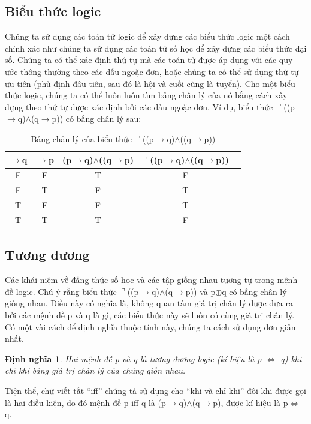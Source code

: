 \documentclass[11pt,a4paper,oneside]{article}
\newtheorem{modeling_def}{Định nghĩa }
\begin{document}
\subsection{Biểu thức logic}
Chúng ta sử dụng các toán tử logic để xây dựng các biểu thức logic một cách chính xác như chúng ta sử dụng các toán tử số học để xây dựng các biểu thức đại số. Chúng ta có thể xác định thứ tự mà các toán tử được áp dụng với các quy ước thông thường theo các dấu ngoặc đơn, hoặc chúng ta có thể sử dụng thứ tự ưu tiên (phủ định đâu tiên, sau đó là hội và cuối cùng là tuyển). Cho một biểu thức logic, chúng ta có thể luôn luôn tìm bảng chân lý của nó bằng cách xây dựng theo thứ tự được xác định bởi các dấu ngoặc đơn. Ví dụ, biểu thức $\urcorner$((p$\rightarrow$q)$\wedge$(q$\rightarrow$p)) có bẳng chân lý sau:

\begin{table}
\centering
\caption{Bảng chân lý của biểu thức
$\urcorner$((p$\rightarrow$q)$\wedge$((q$\rightarrow$p))}
\begin{tabular}{|c|c|c|c|l|} 
\hline $\rightarrow$q&$\rightarrow$p&(p$\rightarrow$q)$\wedge$((q$\rightarrow$p)&$\urcorner$((p$\rightarrow$q)$\wedge$((q$\rightarrow$p))\\ 
\hline F&F&T&F\\ 
\hline F&T&F&T\\ 
\hline T&F&F&T\\ 
\hline T&T&T&F\\
\hline\end{tabular}
\end{table}

\subsection{Tương đương}
Các khái niệm về đẳng thức số học và các tập giống nhau tương tự trong mệnh đề logic. Chú ý rằng biểu thức $\urcorner$((p$\rightarrow$q)$\wedge$(q$\rightarrow$p)) và p$\oplus$q có bẳng chân lý giống nhau. Điều này có nghĩa là, không quan tâm giá trị chân lý được đưa ra bởi các mệnh đề p và q là gì, các biểu thức này sẽ luôn có cùng giá trị chân lý. Có một vài cách để định nghĩa thuộc tính này, chúng ta cách sử dụng đơn giản nhất.

\begin{modeling_def}
Hai mệnh đề p và q là tương đương logic (kí hiệu là p $\Leftrightarrow$ q) khi chỉ khi bảng giá trị chân lý của chúng giồn nhau.
\end{modeling_def}

Tiện thể, chữ viết tắt “iff” chúng tả sử dụng cho “khi và chỉ khi” đôi khi được gọi là hai điều kiện, do đó mệnh đề p iff q là (p$\rightarrow$q)$\wedge$(q$\rightarrow$p), được kí hiệu là p$\Leftrightarrow$q.
\end{document}
